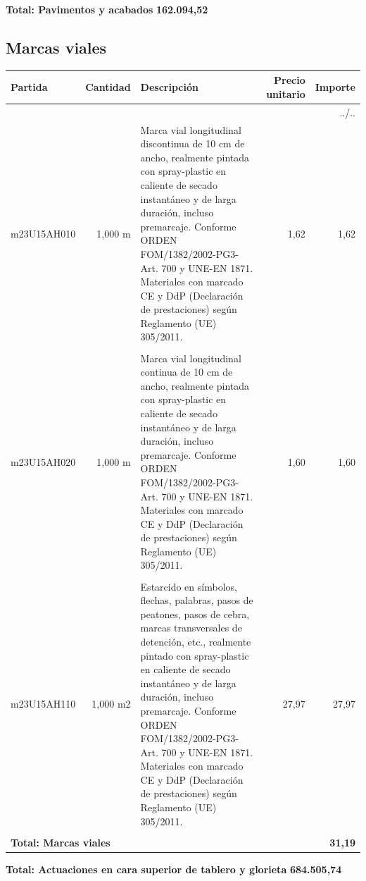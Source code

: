 \documentclass{book}%
\begin{document}
%
\noindent%
\large%
\textbf{Total: Pavimentos y acabados }%
\dotfill%
\textbf{162.094,52}%
\newline%
\normalsize

%
\subsection{Marcas viales}%
\small%
\begin{longtable}{lrlrr}%
Partida&Cantidad&Descripción&\multicolumn{1}{p{1.5cm}}{Precio unitario}&Importe\\%
\hline%
\endhead%
\multicolumn{5}{r}{../..}\\%
\endfoot%
\hline%
\endlastfoot%
m23U15AH010&     1,000 m&\multicolumn{1}{p{5cm}}{Marca vial longitudinal discontinua de 10 cm de ancho, realmente pintada con spray{-}plastic en caliente de secado instantáneo y de larga duración, incluso premarcaje. Conforme ORDEN FOM/1382/2002{-}PG3{-}Art. 700 y UNE{-}EN 1871. Materiales con marcado CE y DdP (Declaración de prestaciones) según Reglamento (UE) 305/2011.}&      1,62&1,62\\%
&&&&\\%
m23U15AH020&     1,000 m&\multicolumn{1}{p{5cm}}{Marca vial longitudinal continua de 10 cm de ancho, realmente pintada con spray{-}plastic en caliente de secado instantáneo y de larga duración, incluso premarcaje. Conforme ORDEN FOM/1382/2002{-}PG3{-}Art. 700 y UNE{-}EN 1871. Materiales con marcado CE y DdP (Declaración de prestaciones) según Reglamento (UE) 305/2011.}&      1,60&1,60\\%
&&&&\\%
m23U15AH110&     1,000 m2&\multicolumn{1}{p{5cm}}{Estarcido en símbolos, flechas, palabras, pasos de peatones, pasos de cebra, marcas transversales de detención, etc., realmente pintado con spray{-}plastic en caliente de secado instantáneo y de larga duración, incluso premarcaje. Conforme ORDEN FOM/1382/2002{-}PG3{-}Art. 700 y UNE{-}EN 1871. Materiales con marcado CE y DdP (Declaración de prestaciones) según Reglamento (UE) 305/2011.}&     27,97&27,97\\%
&&&&\\%
\multicolumn{4}{p{8cm}}{\textbf{Total: Marcas viales}}&\textbf{31,19}\\%
\end{longtable}%
\normalsize

%
\noindent%
\large%
\textbf{Total: Actuaciones en cara superior de tablero y glorieta }%
\dotfill%
\textbf{684.505,74}%
\newline%
\normalsize
\end{document}
